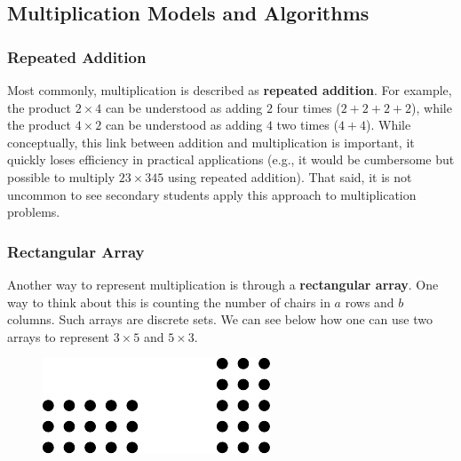 \documentclass[
]{book}
\theoremstyle{definition}
\theoremstyle{definition}
\theoremstyle{definition}
\theoremstyle{definition}
\theoremstyle{remark}
\begin{document}
\hypertarget{multiplication-models-and-algorithms}{%
\subsection{Multiplication Models and Algorithms}\label{multiplication-models-and-algorithms}}

\hypertarget{repeated-addition}{%
\subsubsection*{Repeated Addition}\label{repeated-addition}}

Most commonly, multiplication is described as \textbf{repeated addition}. For example, the product \(2\times 4\) can be understood as adding \(2\) four times (\(2+2+2+2\)), while the product \(4\times 2\) can be understood as adding \(4\) two times (\(4+4\)). While conceptually, this link between addition and multiplication is important, it quickly loses efficiency in practical applications (e.g., it would be cumbersome but possible to multiply \(23\times 345\) using repeated addition). That said, it is not uncommon to see secondary students apply this approach to multiplication problems.

\hypertarget{rectangular-array}{%
\subsubsection*{Rectangular Array}\label{rectangular-array}}

Another way to represent multiplication is through a \textbf{rectangular array}. One way to think about this is counting the number of chairs in \(a\) rows and \(b\) columns. Such arrays are discrete sets. We can see below how one can use two arrays to represent \(3\times 5\) and \(5 \times 3\).

\begin{figure}

{\centering \includegraphics[width=0.5\linewidth]{tikz/arrays} 

}

\end{figure}
\end{document}
